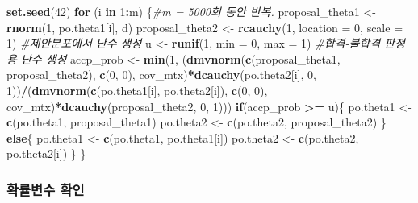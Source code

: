 \documentclass[
]{article}
\newenvironment{Shaded}{\begin{snugshade}}{\end{snugshade}}
\newcommand{\AttributeTok}[1]{\textcolor[rgb]{0.13,0.29,0.53}{#1}}
\newcommand{\CommentTok}[1]{\textcolor[rgb]{0.56,0.35,0.01}{\textit{#1}}}
\newcommand{\ControlFlowTok}[1]{\textcolor[rgb]{0.13,0.29,0.53}{\textbf{#1}}}
\newcommand{\DecValTok}[1]{\textcolor[rgb]{0.00,0.00,0.81}{#1}}
\newcommand{\FunctionTok}[1]{\textcolor[rgb]{0.13,0.29,0.53}{\textbf{#1}}}
\newcommand{\NormalTok}[1]{#1}
\newcommand{\OtherTok}[1]{\textcolor[rgb]{0.56,0.35,0.01}{#1}}
\newcommand{\SpecialCharTok}[1]{\textcolor[rgb]{0.81,0.36,0.00}{\textbf{#1}}}
\begin{document}
\begin{Shaded}
\begin{Highlighting}[]
\FunctionTok{set.seed}\NormalTok{(}\DecValTok{42}\NormalTok{) }
\ControlFlowTok{for}\NormalTok{ (i }\ControlFlowTok{in} \DecValTok{1}\SpecialCharTok{:}\NormalTok{m) \{}\CommentTok{\#m = 5000회 동안 반복.}
\NormalTok{  proposal\_theta1 }\OtherTok{\textless{}{-}} \FunctionTok{rnorm}\NormalTok{(}\DecValTok{1}\NormalTok{, po.theta1[i], d)}
\NormalTok{  proposal\_theta2 }\OtherTok{\textless{}{-}} \FunctionTok{rcauchy}\NormalTok{(}\DecValTok{1}\NormalTok{, }\AttributeTok{location =} \DecValTok{0}\NormalTok{, }\AttributeTok{scale =} \DecValTok{1}\NormalTok{) }\CommentTok{\#제안분포에서 난수 생성}
\NormalTok{  u }\OtherTok{\textless{}{-}} \FunctionTok{runif}\NormalTok{(}\DecValTok{1}\NormalTok{, }\AttributeTok{min =} \DecValTok{0}\NormalTok{, }\AttributeTok{max =} \DecValTok{1}\NormalTok{) }\CommentTok{\#합격{-}불합격 판정용 난수 생성}
\NormalTok{  accp\_prob }\OtherTok{\textless{}{-}} \FunctionTok{min}\NormalTok{(}\DecValTok{1}\NormalTok{, (}\FunctionTok{dmvnorm}\NormalTok{(}\FunctionTok{c}\NormalTok{(proposal\_theta1, proposal\_theta2), }\FunctionTok{c}\NormalTok{(}\DecValTok{0}\NormalTok{, }\DecValTok{0}\NormalTok{), cov\_mtx)}\SpecialCharTok{*}\FunctionTok{dcauchy}\NormalTok{(po.theta2[i], }\DecValTok{0}\NormalTok{, }\DecValTok{1}\NormalTok{))}\SpecialCharTok{/}\NormalTok{(}\FunctionTok{dmvnorm}\NormalTok{(}\FunctionTok{c}\NormalTok{(po.theta1[i], po.theta2[i]), }\FunctionTok{c}\NormalTok{(}\DecValTok{0}\NormalTok{, }\DecValTok{0}\NormalTok{), cov\_mtx)}\SpecialCharTok{*}\FunctionTok{dcauchy}\NormalTok{(proposal\_theta2, }\DecValTok{0}\NormalTok{, }\DecValTok{1}\NormalTok{)))}
  \ControlFlowTok{if}\NormalTok{(accp\_prob }\SpecialCharTok{\textgreater{}=}\NormalTok{ u)\{}
\NormalTok{    po.theta1 }\OtherTok{\textless{}{-}} \FunctionTok{c}\NormalTok{(po.theta1, proposal\_theta1)}
\NormalTok{    po.theta2 }\OtherTok{\textless{}{-}} \FunctionTok{c}\NormalTok{(po.theta2, proposal\_theta2)}
\NormalTok{  \} }\ControlFlowTok{else}\NormalTok{\{}
\NormalTok{    po.theta1 }\OtherTok{\textless{}{-}} \FunctionTok{c}\NormalTok{(po.theta1, po.theta1[i])}
\NormalTok{    po.theta2 }\OtherTok{\textless{}{-}} \FunctionTok{c}\NormalTok{(po.theta2, po.theta2[i])}
\NormalTok{  \}}
\NormalTok{\}}
\end{Highlighting}
\end{Shaded}

\subsubsection{확률변수
확인}\label{uxd655uxb960uxbcc0uxc218-uxd655uxc778-1}
\end{document}
